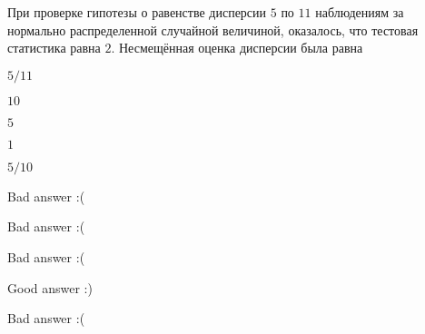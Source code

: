 
\begin{question}
При проверке гипотезы о равенстве дисперсии \(5\) по \(11\) наблюдениям
за нормально распределенной случайной величиной, оказалось, что тестовая
статистика равна \(2\). Несмещённая оценка дисперсии была равна
\begin{answerlist}
  \item \(5/11\)
  \item \(10\)
  \item \(5\)
  \item \(1\)
  \item \(5/10\)
\end{answerlist}
\end{question}

\begin{solution}
\begin{answerlist}
  \item Bad answer :(
  \item Bad answer :(
  \item Bad answer :(
  \item Good answer :)
  \item Bad answer :(
\end{answerlist}
\end{solution}

